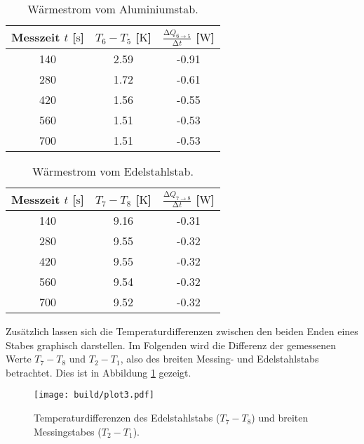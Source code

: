 \begin{table}
    \centering
    \caption{Wärmestrom vom Aluminiumstab.}
    \label{tab:alu}
    \begin{tabular}{c c c}
        \toprule
        Messzeit $t$ [$\si{\second}$]   & $T_{6} - T_{5}$ [$\si{\kelvin}$] &  $\frac{\increment Q_{6 \to 5}}{\increment t}$ [$\si{\watt}$]  \\
        \midrule
        140     &   2.59   & -0.91  \\
        280     &   1.72   &  -0.61  \\
        420     &   1.56   &  -0.55  \\
        560     &   1.51   &   -0.53 \\
        700     &   1.51   &  -0.53 \\
        \bottomrule
    \end{tabular}
\end{table}
\begin{table}
    \centering
    \caption{Wärmestrom vom Edelstahlstab.}
    \label{tab:edel}
    \begin{tabular}{c c c}
        \toprule
        Messzeit $t$ [$\si{\second}$]   & $T_{7} - T_{8}$ [$\si{\kelvin}$] &  $\frac{\increment Q_{7 \to 8}}{\increment t}$ [$\si{\watt}$]  \\
        \midrule
        140     &   9.16   & -0.31  \\
        280     &   9.55   &  -0.32  \\
        420     &   9.55   &  -0.32  \\
        560     &   9.54   &   -0.32 \\
        700     &   9.52   &  -0.32\\
        \bottomrule
    \end{tabular}
\end{table}

Zusätzlich lassen sich die Temperaturdifferenzen zwischen den beiden Enden eines Stabes graphisch darstellen. Im Folgenden wird die Differenz der gemessenen Werte $T_{7} - T_{8}$ und $T_{2} - T_{1}$, also des breiten Messing- und
Edelstahlstabs betrachtet. Dies ist in Abbildung \ref{fig:plot3} gezeigt.

\begin{figure}
    \centering
    \texttt{[image: build/plot3.pdf]}
    \caption{Temperaturdifferenzen des Edelstahlstabs ($T_{7}-T_{8}$) und breiten Messingstabes ($T_{2}-T_{1}$).} 
    \label{fig:plot3}
\end{figure}

